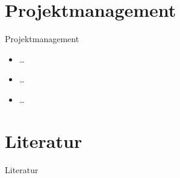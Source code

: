 \documentclass[presentation,bigger,aspectratio=169]{beamer}
\begin{document}
\section{Projektmanagement}
\label{sec:org715aab4}
\begin{frame}[label={sec:org96a9eb7}]{\vspace{2.2cm}\begin{center}\MakeUppercase{\insertsection}\end{center}}
\end{frame}

\begin{frame}[label={sec:orgf120956}]{Projektmanagement}
\begin{itemize}
\item \ldots{}
\item \ldots{}
\item \ldots{}
\end{itemize}
\end{frame}
\section*{Literatur}
\label{sec:org8aaac89}
\begin{frame}[allowframebreaks]{Literatur}
\printbibliography[heading=none]
\end{frame}
\appendix
\end{document}
